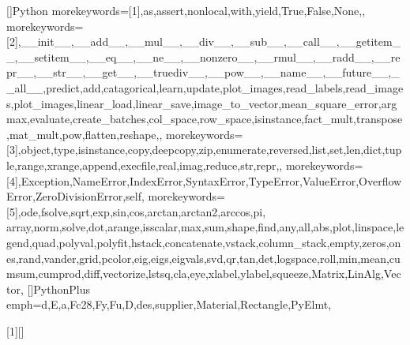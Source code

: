 []{Python}{
  morekeywords=[1]{,as,assert,nonlocal,with,yield,True,False,None,}, %
  morekeywords=[2]{,__init__,__add__,__mul__,__div__,__sub__,__call__,__getitem__,__setitem__,__eq__,__ne__,__nonzero__,__rmul__,__radd__,__repr__,__str__,__get__,__truediv__,__pow__,__name__,__future__,__all__,predict,add,catagorical,learn,update,plot_images,read_labels,read_images,plot_images,linear_load,linear_save,image_to_vector,mean_square_error,argmax,evaluate,create_batches,col_space,row_space,isinstance,fact_mult,transpose,mat_mult,pow,flatten,reshape,}, %
  morekeywords=[3]{,object,type,isinstance,copy,deepcopy,zip,enumerate,reversed,list,set,len,dict,tuple,range,xrange,append,execfile,real,imag,reduce,str,repr,}, %
  morekeywords=[4]{,Exception,NameError,IndexError,SyntaxError,TypeError,ValueError,OverflowError,ZeroDivisionError,self}, %
  morekeywords=[5]{,ode,fsolve,sqrt,exp,sin,cos,arctan,arctan2,arccos,pi,
  array,norm,solve,dot,arange,isscalar,max,sum,shape,find,any,all,abs,plot,linspace,legend,quad,polyval,polyfit,hstack,concatenate,vstack,column_stack,empty,zeros,ones,rand,vander,grid,pcolor,eig,eigs,eigvals,svd,qr,tan,det,logspace,roll,min,mean,cumsum,cumprod,diff,vectorize,lstsq,cla,eye,xlabel,ylabel,squeeze,Matrix,LinAlg,Vector}, %
}
[]{PythonPlus}{
  emph={d,E,a,Fc28,Fy,Fu,D,des,supplier,Material,Rectangle,PyElmt},
}


\newcommand\pythonstyle{\lstset{
style=colorEX,
language=PyBrIM,
}}


[1][]
{
\pythonstyle
\lstset{#1}
}
{}


\newcommand\pythonexternal[2][]{{
\pythonstyle
}}

\newcommand\pythoninline[1]{{\pythonstyle\lstinline!#1!}}


